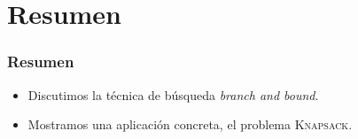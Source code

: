 \documentclass[english, spanish, fleqn,%
hyperref = {colorlinks, urlcolor = blue}%
]{beamer}
\begin{document}
\section{Resumen}

\begin{frame}
  \setcounter{beamerpauses}{2}
  \frametitle{Resumen}

  \begin{itemize}
  \item
    Discutimos la técnica de búsqueda
    \emph{\foreignlanguage{english}{branch and bound}}.
  \item
    Mostramos una aplicación concreta,
    el problema \textsc{Knapsack}.
  \end{itemize}
\end{frame}
\end{document}
